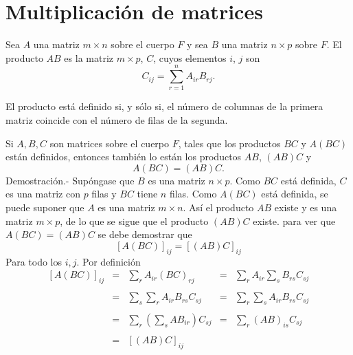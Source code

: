 \begin{comment}
	\end{array}$$

	Por la forma reducida tenemos $Rango(A)=Rango(A/y)$, así el sistema tiene una única solución $y\in \mathbb{R}^3.$\\\\

    \item 

\end{enumerate}

\end{comment}


\section{Multiplicación de matrices}

    \begin{def.}
	Sea $A$ una matriz $m\times n$ sobre el cuerpo $F$ y sea $B$ una matriz $n\times p$ sobre $F$. El producto $AB$ es la matriz $m\times p$, $C$, cuyos elementos $i$, $j$ son
	$$C_{ij} = \sum_{r=1}^n A_{ir}B_{rj}.$$
    \end{def.}

El producto está definido si, y sólo si, el número de columnas de la primera matriz coincide con el número de filas de la segunda.\\

\begin{teo}
    Si $A,B, C$ son matrices sobre el cuerpo $F$, tales que los productos $BC$ y $A(BC)$ están definidos, entonces también lo están los productos $AB$, $(AB)C$ y 
    $$A(BC)=(AB)C.$$
	Demostración.-\; Supóngase que $B$ es una matriz $n\times p$. Como $BC$ está definida, $C$ es una matriz con $p$ filas y $BC$ tiene $n$ filas. Como $A(BC)$ está definida, se puede suponer que $A$ es una matriz $m\times n$. Así el producto $AB$ existe y es una matriz $m\times p$, de lo que se sigue que el producto $(AB)C$ existe. para ver que $A(BC)=(AB)C$ se debe demostrar que
	$$\left[A(BC)\right]_{ij}=\left[(AB)C\right]_{ij}$$
	Para todo los $i,j$. Por definición
	$$\begin{array}{rclcl}
	    \left[A(BC)\right]_{ij} &=& \displaystyle\sum_{r} A_{ir}(BC)_{rj} &=& \displaystyle\sum_{r} A_{ir}\sum_{s} B_{rs}C_{sj}\\\\
				    &=& \displaystyle\sum_{s}\sum_{r} A_{ir}B_{rs}C_{sj} &=& \displaystyle\sum_{r}\sum_{s} A_{ir}B_{rs}C_{sj}\\\\
				    &=& \displaystyle\sum_{r}\left(\sum_{s} AB_{ir}\right)C_{sj} &=& \displaystyle\sum_{r} (AB)_{is}C_{sj}\\\\
				    &=& \left[(AB)C\right]_{ij} &&\\\\
	\end{array}$$
\end{teo}

